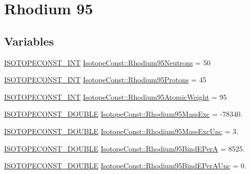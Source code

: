 \hypertarget{group___isotope_const-_rhodium-_rh95}{}\section{Rhodium 95}
\label{group___isotope_const-_rhodium-_rh95}
\subsection*{Variables}
\begin{DoxyCompactItemize}
\item 
\mbox{\hyperlink{group___isotope_const-_macros_ga5f18360b3e99483a35c32d789e62621c}{I\+S\+O\+T\+O\+P\+E\+C\+O\+N\+S\+T\+\_\+\+I\+NT}} \mbox{\hyperlink{group___isotope_const-_rhodium-_rh95_ga90d891a6b99ebd20e576e82ec2392883}{Isotope\+Const\+::\+Rhodium95\+Neutrons}} = 50
\item 
\mbox{\hyperlink{group___isotope_const-_macros_ga5f18360b3e99483a35c32d789e62621c}{I\+S\+O\+T\+O\+P\+E\+C\+O\+N\+S\+T\+\_\+\+I\+NT}} \mbox{\hyperlink{group___isotope_const-_rhodium-_rh95_ga53fcd36d9a91e560926a398863fdcc8b}{Isotope\+Const\+::\+Rhodium95\+Protons}} = 45
\item 
\mbox{\hyperlink{group___isotope_const-_macros_ga5f18360b3e99483a35c32d789e62621c}{I\+S\+O\+T\+O\+P\+E\+C\+O\+N\+S\+T\+\_\+\+I\+NT}} \mbox{\hyperlink{group___isotope_const-_rhodium-_rh95_gafac4484aeac81c070d1ad9bf59aea9c8}{Isotope\+Const\+::\+Rhodium95\+Atomic\+Weight}} = 95
\item 
\mbox{\hyperlink{group___isotope_const-_macros_ga8f45a7272ce02c0b4c65c44636ed719a}{I\+S\+O\+T\+O\+P\+E\+C\+O\+N\+S\+T\+\_\+\+D\+O\+U\+B\+LE}} \mbox{\hyperlink{group___isotope_const-_rhodium-_rh95_gac34e5da2025d20fa11899d554439e1e2}{Isotope\+Const\+::\+Rhodium95\+Mass\+Exc}} = -\/78340.
\item 
\mbox{\hyperlink{group___isotope_const-_macros_ga8f45a7272ce02c0b4c65c44636ed719a}{I\+S\+O\+T\+O\+P\+E\+C\+O\+N\+S\+T\+\_\+\+D\+O\+U\+B\+LE}} \mbox{\hyperlink{group___isotope_const-_rhodium-_rh95_gacd398e2e275970ae4f098654880779c0}{Isotope\+Const\+::\+Rhodium95\+Mass\+Exc\+Unc}} = 3.
\item 
\mbox{\hyperlink{group___isotope_const-_macros_ga8f45a7272ce02c0b4c65c44636ed719a}{I\+S\+O\+T\+O\+P\+E\+C\+O\+N\+S\+T\+\_\+\+D\+O\+U\+B\+LE}} \mbox{\hyperlink{group___isotope_const-_rhodium-_rh95_ga6a8009996ff301e01da0c40be4e093ff}{Isotope\+Const\+::\+Rhodium95\+Bind\+E\+PerA}} = 8525.
\item 
\mbox{\hyperlink{group___isotope_const-_macros_ga8f45a7272ce02c0b4c65c44636ed719a}{I\+S\+O\+T\+O\+P\+E\+C\+O\+N\+S\+T\+\_\+\+D\+O\+U\+B\+LE}} \mbox{\hyperlink{group___isotope_const-_rhodium-_rh95_ga7370238c878bdbc61008b75f353904e2}{Isotope\+Const\+::\+Rhodium95\+Bind\+E\+Per\+A\+Unc}} = 0.

\end{DoxyCompactItemize}
